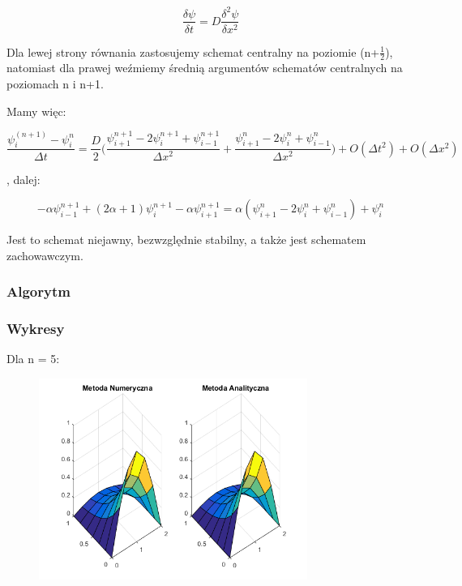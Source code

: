 $$\dfrac{\delta \psi}{\delta t} = D\dfrac{\delta^2 \psi}{\delta x^2}$$

Dla lewej strony równania zastosujemy schemat centralny na poziomie (n+$\frac{1}{2}$), natomiast dla prawej weźmiemy średnią argumentów schematów centralnych na poziomach n i n+1.

Mamy więc:

$$\dfrac{\psi^{(n+1)}_{i}-\psi^n_{i}}{\Delta t}=\dfrac{D}{2}\Bigg(\dfrac{\psi^{n+1}_{i+1}-2\psi^{n+1}_{i}+\psi^{n+1}_{i-1}}{\Delta x^2} + \dfrac{\psi^{n}_{i+1}-2\psi^{n}_{i}+\psi^{n}_{i-1}}{\Delta x^2}\Bigg) + O(\Delta t^2) + O(\Delta x^2) $$

, dalej:

$$-\alpha\psi^{n+1}_{i-1}+(2\alpha+1)\psi^{n+1}_{i}-\alpha\psi^{n+1}_{i+1}=\alpha(\psi^{n}_{i+1}-2\psi^{n}_{i}+\psi^{n}_{i-1})+\psi^{n}_{i}$$

Jest to schemat niejawny, bezwzględnie stabilny, a także jest schematem zachowawczym.

\newpage

\subsubsection{Algorytm}

\newpage
\subsubsection{Wykresy}

Dla n = 5:

\begin{figure}[!ht]
	\begin{center}
		\includegraphics[width=0.78\textwidth]{Lab7/charts/cn/5.png}
	\end{center}
\end{figure}

